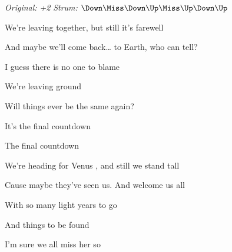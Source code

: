 \begin{song}


\begin{headerbox}
\textit{Original: +2} \quad
\textit{Strum:} $\Down\Miss\Down\Up\Miss\Up\Down\Up$
\end{headerbox}

\begin{hchordbox}
\end{hchordbox}

\Large

\bigskip

\Intro \par
{}    \par
{}    \par
{}     \par

\bigskip

 We’re leaving together, but still it’s farewell \par
{} And maybe we’ll come back…  to Earth, who can tell? \par
{} I guess there is no one to blame \par
{} We’re leaving ground  \par
{} Will things ever be the same again? \par

\bigskip

It’s the final countdown    \par
The final countdown    \par

\bigskip

 We’re heading for Venus , and still we stand tall \par
{} Cause maybe they’ve seen us.  And welcome us all  \par
{} With so many light years to go \par
{} And things to be found  \par
{} I’m sure we all miss her so \par


\end{song}
